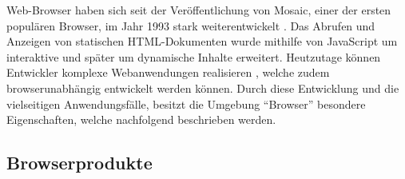 Web-Browser haben sich seit der Veröffentlichung von Mosaic, einer der ersten populären Browser, im Jahr 1993 stark weiterentwickelt \cite{EvolutionOfTheWebBrowser}. Das Abrufen und Anzeigen von statischen HTML-Dokumenten wurde mithilfe von JavaScript um interaktive und später um dynamische Inhalte erweitert. Heutzutage können Entwickler komplexe Webanwendungen realisieren \cite{SinglePageApplication}, welche zudem browserunabhängig entwickelt werden können. Durch diese Entwicklung und die vielseitigen Anwendungsfälle, besitzt die Umgebung \enquote{Browser} besondere Eigenschaften, welche nachfolgend beschrieben werden.

\subsection{Browserprodukte}
\label{sec:browserprodukte}



